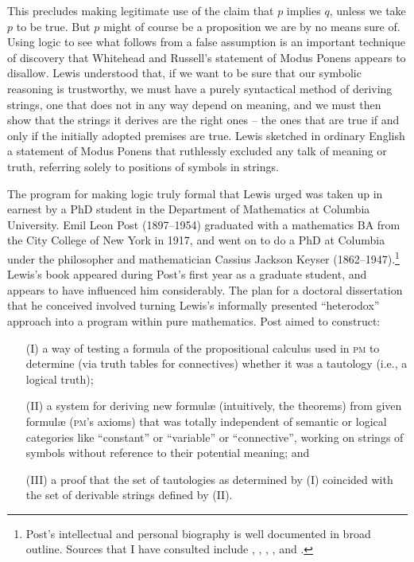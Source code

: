 \documentclass[output=paper]{langscibook}
\begin{document}
This precludes making legitimate use of the claim that $p$ implies $q$, unless we take $p$ to be true.  But $p$ might of course be a proposition we are by no means sure of.  Using logic to see what follows from a false assumption is an important technique of discovery that Whitehead and Russell's statement of Modus Ponens appears to disallow. Lewis understood that, if we want to be sure that our symbolic reasoning is trustworthy, we must have a purely syntactical method of deriving strings, one that does not in any way depend on meaning, and we must then show that the strings it derives are the right ones -- the ones that are true if and only if the initially adopted premises are true. Lewis sketched in ordinary English a statement of Modus Ponens that ruthlessly excluded any talk of meaning or truth, referring solely to positions of symbols in strings.

The program for making logic truly formal that Lewis urged was taken up in earnest by a PhD student in the Department of Mathematics at Columbia University. Emil Leon Post (1897--1954) graduated with a mathematics BA from the City College of New York in 1917, and went on to do a PhD at Columbia under the philosopher and mathematician Cassius Jackson Keyser (1862--1947).\footnote{Post's intellectual and personal biography is well documented in broad outline. Sources that I have consulted include \citet{Davis94}, \citet{Stillwell04}, \citet{DeMol06}, \citet{Urquhart09}, and \citet{Jackson18}.} Lewis's book appeared during Post's first year as a graduate student, and appears to have influenced him considerably. The plan for a doctoral dissertation that he conceived involved turning Lewis's informally presented ``heterodox'' approach into a program within pure mathematics. Post aimed to construct:

\begin{itemize}
\item[(I)]   a way of testing a formula of the propositional calculus used in \textsc{pm} to determine (via truth tables for connectives) whether it was a tautology (i.e., a logical truth); 
\item[(II)]  a system for deriving new formul{\ae} (intuitively, the theorems) from given formul{\ae} (\textsc{pm}'s axioms) that was totally independent of semantic or logical categories like ``constant'' or ``variable'' or ``connective'', working on strings of symbols without reference to their potential meaning; and 
\item[(III)] a proof that the set of tautologies as determined by (I) coincided with the set of derivable strings defined by (II).
\end{itemize} 
\end{document}
